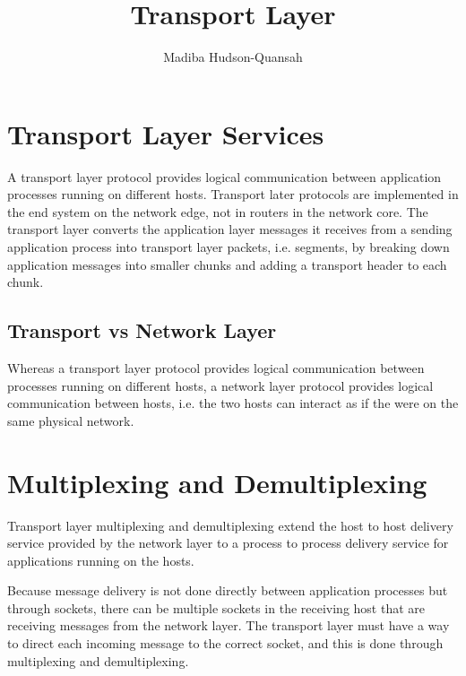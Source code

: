\documentclass[12pt letter]{report}
\title{\Huge{Transport Layer}}
\author{\huge{Madiba Hudson-Quansah}}
\date{}
\begin{document}
\maketitle
\newpage
{}
\tableofcontents
\pagebreak

\chapter{Transport Layer Services}


A transport layer protocol provides logical communication between
application processes running on different hosts. Transport later
protocols are implemented in the end system on the network edge, not
in routers in the network core. The transport layer converts the
application layer messages it receives from a sending application
process into transport layer packets, i.e. segments, by breaking down
application messages into smaller chunks and adding a transport
header to each chunk.

\section{Transport vs Network Layer}

Whereas a transport layer protocol provides logical communication
between processes running on different hosts, a network layer
protocol provides logical communication between hosts, i.e. the two
hosts can interact as if the were on the same physical network.

\chapter{Multiplexing and Demultiplexing}

Transport layer multiplexing and demultiplexing extend the host to
host delivery service provided by the network layer to a process to
process delivery service for applications running on the hosts.

Because message delivery is not done directly between application
processes but through sockets, there can be multiple sockets in the
receiving host that are receiving messages from the network layer.
The transport layer must have a way to direct each incoming message
to the correct socket, and this is done through multiplexing and demultiplexing.
\end{document}

